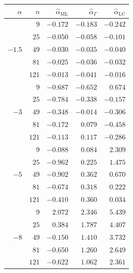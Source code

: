 \documentclass[10pt,a4paper]{article}
\begin{document}
\vspace{1cm}

\begin{minipage}{0.5\linewidth}
\begin{tabular}{rrrrr}
	\toprule
	$\alpha$ & $n$ & $\widehat{\alpha}_{\text{ML}}$ & $\widehat{\alpha}_{\Gamma}$ & $\widehat{\alpha}_{\text{LC}}$\\  
	\midrule
	\multirow{5 }{*}{$-1.5$}
	& $9$   & $-0.172$ & $-0.183$ & $-0.242$ \\ 
	& $25$  & $-0.050$ & $-0.058$ & $-0.101$ \\ 
	& $49$  & $-0.030$ & $-0.035$ & $-0.040$ \\ 
	& $81$  & $-0.025$ & $-0.036$ & $-0.032$ \\ 
	& $121$ & $-0.013$ & $-0.041$ & $-0.016$ \\ 	
	\midrule
	\multirow{5 }{*}{$-3$}
	& $9$   & $-0.687$ & $-0.652$ & $0.674$  \\ 
	& $25$  & $-0.784$ & $-0.338$ & $-0.157$ \\ 
	& $49$  & $-0.348$ & $-0.014$ & $-0.306$ \\ 
	& $81$  & $-0.172$ & $0.079$  & $-0.458$ \\ 
	& $121$ & $-0.113$ & $0.117$  & $-0.286$ \\ 	
	\midrule
	\multirow{5 }{*}{$-5$} 
	& $9$   & $-0.088$ & $0.084$ & $2.309$ \\ 
	& $25$  & $-0.962$ & $0.225$ & $1.475$ \\ 
	& $49$  & $-0.902$ & $0.362$ & $0.670$ \\ 
	& $81$  & $-0.674$ & $0.318$ & $0.222$ \\ 
	& $121$ & $-0.410$ & $0.360$ & $0.034$ \\ 
	\midrule
	\multirow{5 }{*}{$-8$} 	
	& $9$   & $2.072$  & $2.346$ & $5.439$ \\ 	
	& $25$  & $0.384$  & $1.787$ & $4.407$ \\ 
	& $49$  & $-0.150$ & $1.410$ & $3.732$ \\ 
	& $81$  & $-0.650$ & $1.260$ & $2.649$ \\ 
	& $121$ & $-0.622$ & $1.062$ & $2.361$ \\ 
	\bottomrule
\end{tabular}
\end{minipage}
\;
\end{document}
